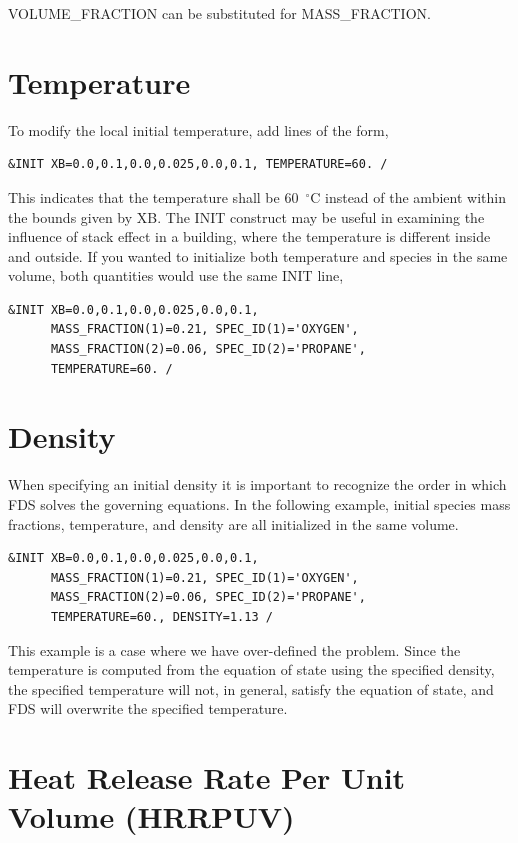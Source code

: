 \documentclass[11pt]{book}
\begin{document}
{\ct VOLUME\_FRACTION} can be substituted for {\ct MASS\_FRACTION}.

\section{Temperature}

To modify the local initial temperature, add lines of the form,
\begin{lstlisting}
&INIT XB=0.0,0.1,0.0,0.025,0.0,0.1, TEMPERATURE=60. /
\end{lstlisting}
This indicates that the temperature shall be 60~$^\circ$C instead of the ambient within the bounds given by {\ct XB}. The {\ct INIT} construct may be useful in examining the influence of stack effect in a building, where the temperature is different inside and outside. If you wanted to initialize both temperature and species in the same volume, both quantities would use the same {\ct INIT} line,
\begin{lstlisting}
&INIT XB=0.0,0.1,0.0,0.025,0.0,0.1,
      MASS_FRACTION(1)=0.21, SPEC_ID(1)='OXYGEN',
      MASS_FRACTION(2)=0.06, SPEC_ID(2)='PROPANE',
      TEMPERATURE=60. /
\end{lstlisting}

\section{Density}

When specifying an initial density it is important to recognize the order in which FDS solves the governing equations. In the following example, initial species mass fractions, temperature, and density are all initialized in the same volume.
\begin{lstlisting}
&INIT XB=0.0,0.1,0.0,0.025,0.0,0.1,
      MASS_FRACTION(1)=0.21, SPEC_ID(1)='OXYGEN',
      MASS_FRACTION(2)=0.06, SPEC_ID(2)='PROPANE',
      TEMPERATURE=60., DENSITY=1.13 /
\end{lstlisting}
This example is a case where we have over-defined the problem. Since the temperature is computed from the equation of state using the specified density, the specified temperature will not, in general, satisfy the equation of state, and FDS will overwrite the specified temperature.

\section{Heat Release Rate Per Unit Volume (HRRPUV)}
\end{document}
